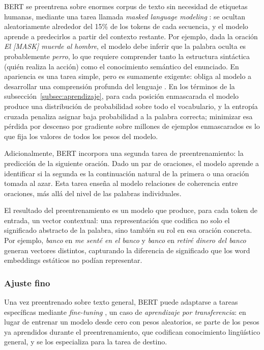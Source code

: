 BERT se preentrena sobre enormes corpus de texto sin necesidad de etiquetas humanas, mediante una tarea llamada \textit{masked language modeling} \parencite{devlin_2019_bert}: se ocultan aleatoriamente alrededor del 15\% de los tokens de cada secuencia, y el modelo aprende a predecirlos a partir del contexto restante. Por ejemplo, dada la oración \textit{El [MASK] muerde al hombre}, el modelo debe inferir que la palabra oculta es probablemente \textit{perro}, lo que requiere comprender tanto la estructura sintáctica (quién realiza la acción) como el conocimiento semántico del enunciado. En apariencia es una tarea simple, pero es sumamente exigente: obliga al modelo a desarrollar una comprensión profunda del lenguaje \parencite{rogers_2020_bertology}. En los términos de la subsección~\ref{subsec:aprendizaje}, para cada posición enmascarada el modelo produce una distribución de probabilidad sobre todo el vocabulario, y la entropía cruzada penaliza asignar baja probabilidad a la palabra correcta; minimizar esa pérdida por descenso por gradiente sobre millones de ejemplos enmascarados es lo que fija los valores de todos los pesos del modelo.

Adicionalmente, BERT incorpora una segunda tarea de preentrenamiento: la predicción de la siguiente oración. Dado un par de oraciones, el modelo aprende a identificar si la segunda es la continuación natural de la primera o una oración tomada al azar. Esta tarea enseña al modelo relaciones de coherencia entre oraciones, más allá del nivel de las palabras individuales.

El resultado del preentrenamiento es un modelo que produce, para cada token de entrada, un vector contextual: una representación que codifica no solo el significado abstracto de la palabra, sino también su rol en esa oración concreta. Por ejemplo, \textit{banco} en \textit{me senté en el banco} y \textit{banco} en \textit{retiré dinero del banco} generan vectores distintos, capturando la diferencia de significado que los word embeddings estáticos no podían representar.

\subsubsection*{Ajuste fino}

Una vez preentrenado sobre texto general, BERT puede adaptarse a tareas específicas mediante \textit{fine-tuning} \parencite{devlin_2019_bert}, un caso de \textit{aprendizaje por transferencia}: en lugar de entrenar un modelo desde cero con pesos aleatorios, se parte de los pesos ya aprendidos durante el preentrenamiento, que codifican conocimiento lingüístico general, y se los especializa para la tarea de destino.

